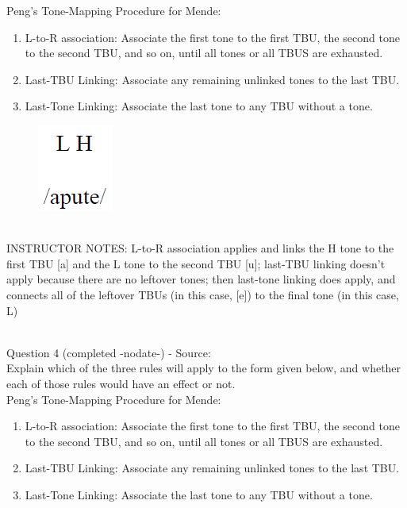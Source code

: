 \documentclass[12pt]{article}
\begin{document}
Peng’s Tone-Mapping Procedure for Mende: \begin{enumerate} \item L-to-R association: Associate the first tone to the first TBU, the second tone to the second TBU, and so on, until all tones or all TBUS are exhausted. \item Last-TBU Linking: Associate any remaining unlinked tones to the last TBU. \item Last-Tone Linking: Associate the last tone to any TBU without a tone. \end{enumerate}

\begin{figure}[H]
\includegraphics{../images/mendetone_c.png}
\end{figure}

~\\
INSTRUCTOR NOTES: L-to-R association applies and links the H tone to the first TBU [a] and the L tone to the second TBU [u]; last-TBU linking doesn't apply because there are no leftover tones; then last-tone linking does apply, and connects all of the leftover TBUs (in this case, [e]) to the final tone (in this case, L)


~\\

{\large Question 4} (completed -nodate-) - Source: \\

Explain which of the three rules will apply to the form given below, and whether each of those rules would have an effect or not.\\

Peng’s Tone-Mapping Procedure for Mende: \begin{enumerate} \item L-to-R association: Associate the first tone to the first TBU, the second tone to the second TBU, and so on, until all tones or all TBUS are exhausted. \item Last-TBU Linking: Associate any remaining unlinked tones to the last TBU. \item Last-Tone Linking: Associate the last tone to any TBU without a tone. \end{enumerate}
\end{document}
